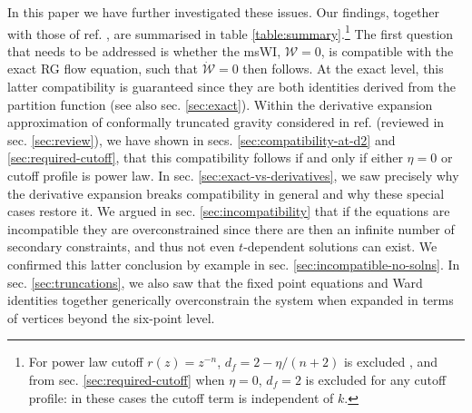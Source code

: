 \documentclass[11pt]{book} %
\begin{document}
In this paper we have further investigated these issues. Our findings, together with those of ref. \cite{Dietz:2015owa}, are summarised in table \ref{table:summary}.\footnote{For power law cutoff  $r(z)=z^{-n}$, $d_f = 2-\eta/(n+2)$ is excluded \cite{Dietz:2015owa}, and from sec. \ref{sec:required-cutoff} when $\eta=0$,  $d_f=2$ is excluded for any cutoff profile: in these cases the cutoff term is independent of $k$.} The first question that needs to be addressed is whether the msWI, $\mathcal{W}=0$, is compatible with the exact RG flow equation, \ie such that $\dot{\mathcal{W}}=0$ then follows. At the exact level, this latter compatibility is guaranteed since they are both identities derived from the partition function (see also sec. \ref{sec:exact}). Within the derivative expansion approximation of conformally truncated gravity considered in ref. \cite{Dietz:2015owa} (reviewed in sec. \ref{sec:review}), we have shown  in secs. \ref{sec:compatibility-at-d2} and \ref{sec:required-cutoff}, that this compatibility follows if and only if either $\eta=0$ or cutoff profile is power law. In sec. \ref{sec:exact-vs-derivatives}, we saw precisely why the derivative expansion breaks compatibility in general and why these special cases restore it. We argued in sec. \ref{sec:incompatibility} that if the equations are incompatible they are overconstrained since there are then an infinite number of secondary constraints, and thus not even $t$-dependent solutions can exist. We confirmed this latter conclusion by example in sec. \ref{sec:incompatible-no-solns}. In sec. \ref{sec:truncations}, we also saw that the fixed point equations and Ward identities together generically overconstrain the system when expanded in terms of vertices beyond the six-point level.

\end{document}
